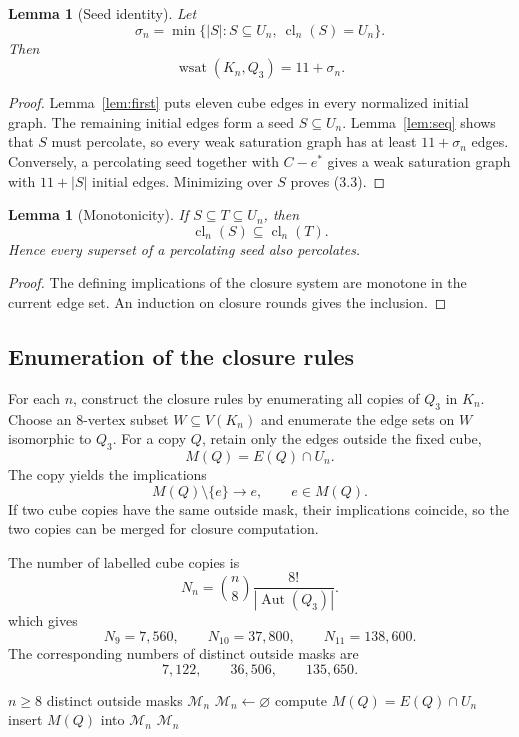 \documentclass[11pt]{article}
\numberwithin{equation}{section}
\newtheorem{lemma}[theorem]{Lemma}
\newcommand{\wsat}{\operatorname{wsat}}
\newcommand{\cl}{\operatorname{cl}}
\newcommand{\Aut}{\operatorname{Aut}}
\begin{document}
\begin{lemma}[Seed identity]\label{lem:seed}
Let
\[
\sigma_n=\min\{|S|:S\subseteq U_n,\ \cl_n(S)=U_n\}.
\]
Then
\[
\boxed{\wsat(K_n,Q_3)=11+\sigma_n.}
\tag{3.3}
\]
\end{lemma}

\begin{proof}
Lemma~\ref{lem:first} puts eleven cube edges in every normalized initial graph. The remaining initial edges form a seed $S\subseteq U_n$. Lemma~\ref{lem:seq} shows that $S$ must percolate, so every weak saturation graph has at least $11+\sigma_n$ edges. Conversely, a percolating seed together with $C-e^*$ gives a weak saturation graph with $11+|S|$ initial edges. Minimizing over $S$ proves (3.3).
\end{proof}

\begin{lemma}[Monotonicity]\label{lem:mono}
If $S\subseteq T\subseteq U_n$, then
\[
\cl_n(S)\subseteq\cl_n(T).
\]
Hence every superset of a percolating seed also percolates.
\end{lemma}

\begin{proof}
The defining implications of the closure system are monotone in the current edge set. An induction on closure rounds gives the inclusion.
\end{proof}

\subsection{Enumeration of the closure rules}\label{sec:maskenumeration}
For each $n$, construct the closure rules by enumerating all copies of $Q_3$
in $K_n$. Choose an $8$-vertex subset $W\subseteq V(K_n)$ and enumerate the
edge sets on $W$ isomorphic to $Q_3$. For a copy $Q$, retain only the edges
outside the fixed cube,
\[
M(Q)=E(Q)\cap U_n.
\]
The copy yields the implications
\[
M(Q)\setminus\{e\}\longrightarrow e,
\qquad e\in M(Q).
\tag{3.4}
\]
If two cube copies have the same outside mask, their implications coincide,
so the two copies can be merged for closure computation.

The number of labelled cube copies is
\[
N_n=\binom{n}{8}\frac{8!}{|\Aut(Q_3)|}.
\tag{3.5}
\]
which gives
\[
N_9=7,560,\qquad N_{10}=37,800,\qquad N_{11}=138,600.
\tag{3.6}
\]
The corresponding numbers of distinct outside masks are
\[
7,122,\qquad36,506,\qquad135,650.
\tag{3.7}
\]

\begin{algorithm}[t]
\caption{Construction of the complete outside-rule system}
\label{alg:masks}
\begin{algorithmic}[1]
\Require $n\ge8$
\Ensure distinct outside masks $\mathcal M_n$
\State $\mathcal M_n\gets\varnothing$
        \State compute $M(Q)=E(Q)\cap U_n$
        \State insert $M(Q)$ into $\mathcal M_n$
    \EndFor
\EndFor
\State \Return $\mathcal M_n$
\end{algorithmic}
\end{algorithm}
\end{document}
